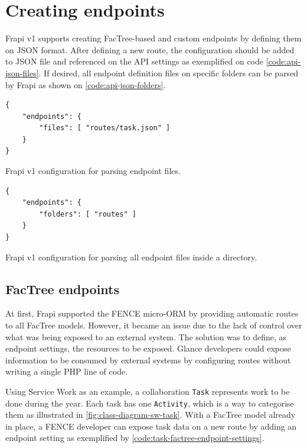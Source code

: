 \section{Creating endpoints}\label{sec:creating-endpoints}

Frapi v1 supports creating FacTree-based and custom endpoints by defining them on JSON format. After defining a new route, the configuration should be added to JSON file and referenced on the API settings as exemplified on code \autoref{code:api-json-files}. If desired, all endpoint definition files on specific folders can be parsed by Frapi as shown on \autoref{code:api-json-folders}.

\begin{listing}[htbp]
\begin{verbatim}
{
	"endpoints": {
	    "files": [ "routes/task.json" ]
	}
}
\end{verbatim}
\caption{Frapi v1 configuration for parsing endpoint files.}
\label{code:api-json-files}
\end{listing}

\begin{listing}[htbp]
\begin{verbatim}
{
	"endpoints": {
		"folders": [ "routes" ]
	}
}
\end{verbatim}
\caption{Frapi v1 configuration for parsing all endpoint files inside a directory.}
\label{code:api-json-folders}
\end{listing}

\subsection{FacTree endpoints}

At first, Frapi supported the FENCE micro-ORM by providing automatic routes to all FacTree models. However, it became an issue due to the lack of control over what was being exposed to an external system. The solution was to define, as endpoint settings, the resources to be exposed. Glance developers could expose information to be consumed by external systems by configuring routes without writing a single PHP line of code.

Using Service Work as an example, a collaboration \texttt{Task} represents work to be done during the year. Each task has one \texttt{Activity}, which is a way to categorise them as illustrated in \autoref{fig:class-diagram-sw-task}. With a FacTree model already in place, a FENCE developer can expose task data on a new route by adding an endpoint setting as exemplified by \autoref{code:task-factree-endpoint-settings}.


